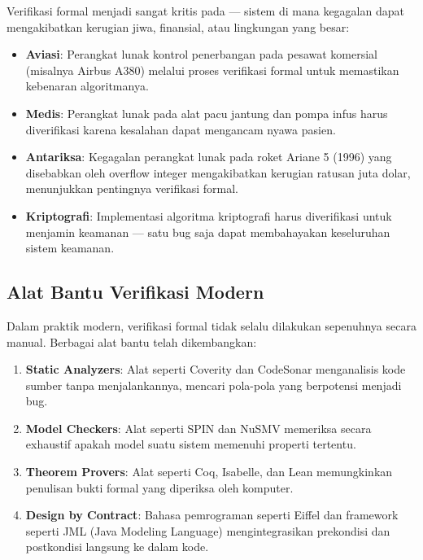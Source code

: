 Verifikasi formal menjadi sangat kritis pada  --- sistem di mana kegagalan dapat mengakibatkan kerugian jiwa, finansial, atau lingkungan yang besar:

\begin{itemize}
    \item \textbf{Aviasi}: Perangkat lunak kontrol penerbangan pada pesawat komersial (misalnya Airbus A380) melalui proses verifikasi formal untuk memastikan kebenaran algoritmanya.
    \item \textbf{Medis}: Perangkat lunak pada alat pacu jantung dan pompa infus harus diverifikasi karena kesalahan dapat mengancam nyawa pasien.
    \item \textbf{Antariksa}: Kegagalan perangkat lunak pada roket Ariane 5 (1996) yang disebabkan oleh overflow integer mengakibatkan kerugian ratusan juta dolar, menunjukkan pentingnya verifikasi formal.
    \item \textbf{Kriptografi}: Implementasi algoritma kriptografi harus diverifikasi untuk menjamin keamanan --- satu bug saja dapat membahayakan keseluruhan sistem keamanan.
\end{itemize}

\subsection{Alat Bantu Verifikasi Modern}

Dalam praktik modern, verifikasi formal tidak selalu dilakukan sepenuhnya secara manual. Berbagai alat bantu telah dikembangkan:

\begin{enumerate}
    \item \textbf{Static Analyzers}: Alat seperti Coverity dan CodeSonar menganalisis kode sumber tanpa menjalankannya, mencari pola-pola yang berpotensi menjadi bug.
    \item \textbf{Model Checkers}: Alat seperti SPIN dan NuSMV memeriksa secara exhaustif apakah model suatu sistem memenuhi properti tertentu.
    \item \textbf{Theorem Provers}: Alat seperti Coq, Isabelle, dan Lean memungkinkan penulisan bukti formal yang diperiksa oleh komputer.
    \item \textbf{Design by Contract}: Bahasa pemrograman seperti Eiffel dan framework seperti JML (Java Modeling Language) mengintegrasikan prekondisi dan postkondisi langsung ke dalam kode.
\end{enumerate}


